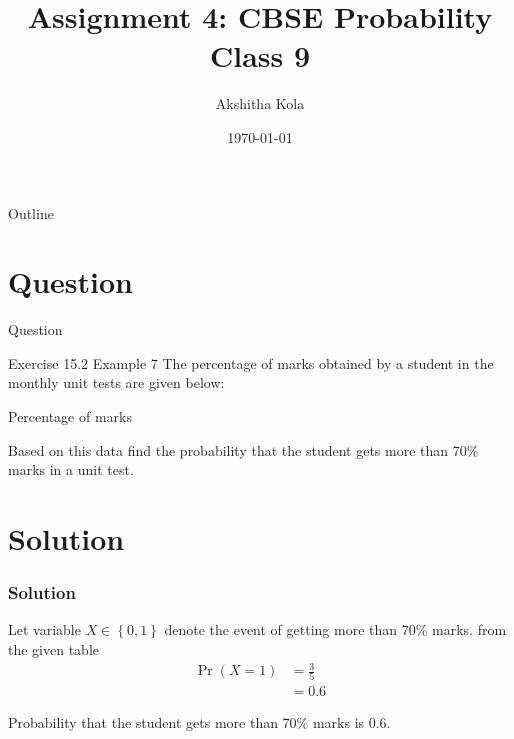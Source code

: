 \documentclass{beamer}
\title{Assignment 4: CBSE Probability Class 9 }
\author{Akshitha Kola}
\date{\today}
\providecommand{\pr}[1]{\ensuremath{\Pr\left(#1\right)}}
\providecommand{\cbrak}[1]{\ensuremath{\left\{#1\right\}}}
\begin{document}
\begin{frame}
    \titlepage 
\end{frame}

\logo{}

\begin{frame}{Outline}
    \tableofcontents
\end{frame}

\section{Question}
\begin{frame}{Question}
    \begin{block}{Exercise 15.2 Example 7}
         The percentage of marks obtained by a student in the monthly unit tests are given below: 
         
\begin{table}[ht!]
\begin{center}
    
	\vspace{5pt}
\caption{Percentage of marks}
\label{table:table1}
\end{center}
	
\end{table}
  
    
Based on this data find the probability that the student gets more than 70\% marks in a unit test. \\

\end{block}
\end{frame}

\section{Solution}
\begin{frame}
\frametitle{Solution}
Let variable $X \in \cbrak{0,1}$ denote the event of getting more than 70\% marks.
from the given table 
\begin{align}
  \pr {X=1} &= \frac{3}{5} \\
  &= 0.6
\end{align}
\begin{block}{}
Probability that the student gets more than 70\% marks is 0.6.
\end{block}
\end{frame}
\end{document}
